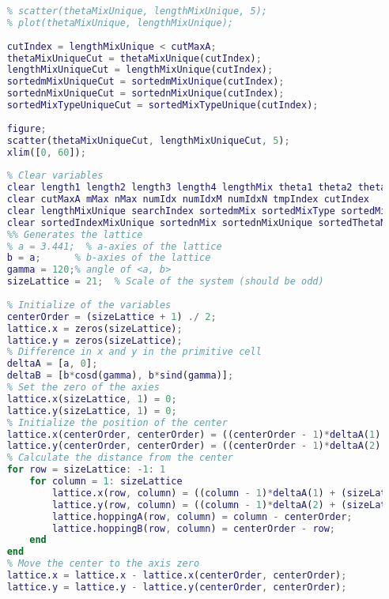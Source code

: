 \begin{lstlisting}[language=Matlab]
    % figure;
    % scatter(thetaMixUnique, lengthMixUnique, 5);
    % plot(thetaMixUnique, lengthMixUnique);
    
    cutIndex = lengthMixUnique < cutMaxA;
    thetaMixUniqueCut = thetaMixUnique(cutIndex);
    lengthMixUniqueCut = lengthMixUnique(cutIndex);
    sortedmMixUniqueCut = sortedmMixUnique(cutIndex);
    sortednMixUniqueCut = sortednMixUnique(cutIndex);
    sortedMixTypeUniqueCut = sortedMixTypeUnique(cutIndex);
    
    figure;
    scatter(thetaMixUniqueCut, lengthMixUniqueCut, 5);
    xlim([0, 60]);
    
    % Clear variables
    clear length1 length2 length3 length4 lengthMix theta1 theta2 theta3 theta4 thetaMix
    clear cutMaxA mMax nMax numIdx numIdxM numIdxN tmpIndex cutIndex
    clear lengthMixUnique searchIndex sortedmMix sortedMixType sortedMixTypeUnique sortedIndexMix sortedmMix sortedmMixUnique
    clear sortedIndexMixUnique sortednMix sortednMixUnique sortedThetaMix thetaMixUnique
    %% Generates the lattice
    % a = 3.441;  % a-axies of the lattice
    b = a;      % b-axies of the lattice
    gamma = 120;% angle of <a, b>
    sizeLattice = 21;  % Scale of the system (should be odd)
    
    % Initialize of the variables
    centerOrder = (sizeLattice + 1) ./ 2;
    lattice.x = zeros(sizeLattice);
    lattice.y = zeros(sizeLattice);
    % Difference in x and y in the primitive cell
    deltaA = [a, 0];
    deltaB = [b*cosd(gamma), b*sind(gamma)];
    % Set the zero of the axies
    lattice.x(sizeLattice, 1) = 0;
    lattice.y(sizeLattice, 1) = 0;
    % Initialize the position of the center
    lattice.x(centerOrder, centerOrder) = ((centerOrder - 1)*deltaA(1) + (sizeLattice - centerOrder)*deltaB(1));
    lattice.y(centerOrder, centerOrder) = ((centerOrder - 1)*deltaA(2) + (sizeLattice - centerOrder)*deltaB(2));
    % Calculate the distance from the center
    for row = sizeLattice: -1: 1
        for column = 1: sizeLattice
            lattice.x(row, column) = ((column - 1)*deltaA(1) + (sizeLattice - row)*deltaB(1));
            lattice.y(row, column) = ((column - 1)*deltaA(2) + (sizeLattice - row)*deltaB(2));
            lattice.hoppingA(row, column) = column - centerOrder;
            lattice.hoppingB(row, column) = centerOrder - row;
        end
    end
    % Move the center to the axis zero
    lattice.x = lattice.x - lattice.x(centerOrder, centerOrder);
    lattice.y = lattice.y - lattice.y(centerOrder, centerOrder);
    

\end{lstlisting}

